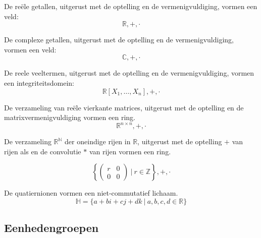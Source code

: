\documentclass[main.tex]{subfiles}
\begin{document}
\begin{vb}
  De re\"ele getallen, uitgerust met de optelling en de vermenigvuldiging, vormen een veld:
  \[ \mathbb{R},+,\cdot \]
\commj {} \domein \lichaam \veld
\end{vb}

\begin{vb}
  De complexe getallen, uitgerust met de optelling en de vermenigvuldiging, vormen een veld:
  \[ \mathbb{C},+,\cdot \]
  \commj {} \domein \lichaam \veld
\end{vb}

\begin{vb}
  De reele veeltermen, uitgerust met de optelling en de vermenigvuldiging, vormen een integriteitsdomein: 
  \[ \mathbb{R}[X_{1},\dotsc,X_{n}],+,\cdot \]
  \commj {} \domein
\end{vb}

\begin{vb}
  De verzameling van re\"ele vierkante matrices, uitgerust met de optelling en de matrixvermenigvuldiging vormen een ring. 
  \[ \mathbb{R}^{n\times n},+,\cdot \]
  \commn {}
\end{vb}

\begin{vb}
  De verzameling $\mathbb{R}^{\mathbb{N}}$ der oneindige rijen in $\mathbb{R}$, uitgerust met de optelling $+$ van rijen als en de convolutie $*$ van rijen vormen een ring.\\
   \commj
\end{vb}

\begin{vb}
  \[
  \left\{
    \begin{pmatrix}
      r & 0\\
      0 & 0
    \end{pmatrix}
    \ |\
    r \in \mathbb{Z}
  \right\},+,\cdot
  \]
  \commj {} \domein
\end{vb}

\begin{vb}
  De quatiernionen vormen een niet-commutatief lichaam.
  \[ \mathbb{H} = \{ a + bi + cj + dk \ |\ a,b,c,d \in \mathbb{R} \} \]
  \commn \eenhj{$1$} \lichaam 
\end{vb}

\subsection{Eenhedengroepen}
\label{sec:eenhedengroepen}
\end{document}
